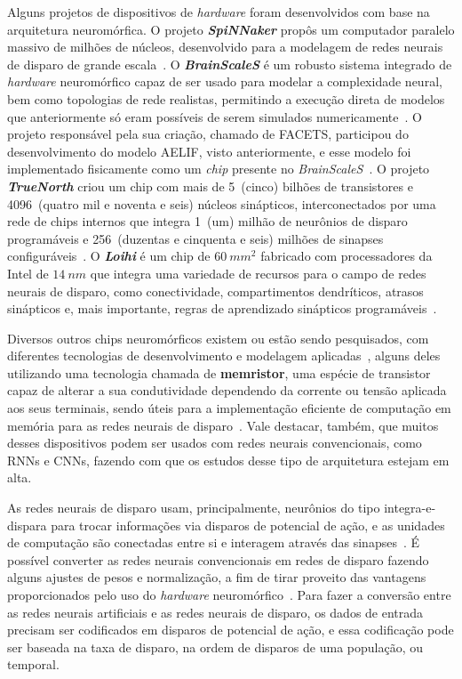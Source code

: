 Alguns projetos de dispositivos de \textit{hardware} foram desenvolvidos com base na arquitetura neuromórfica. O projeto \textbf{\textit{SpiNNaker}} propôs um computador paralelo massivo de milhões de núcleos, desenvolvido para a modelagem de redes neurais de disparo de grande escala~\cite{furber_spinnaker_2014}. O \textbf{\textit{BrainScaleS}} é um robusto sistema integrado de \textit{hardware} neuromórfico capaz de ser usado para modelar a complexidade neural, bem como topologias de rede realistas, permitindo a execução direta de modelos que anteriormente só eram possíveis de serem simulados numericamente~\cite{schemmel_wafer-scale_2010}. O projeto responsável pela sua criação, chamado de FACETS, participou do desenvolvimento do modelo AELIF, visto anteriormente, e esse modelo foi implementado fisicamente como um \textit{chip} presente no \textit{BrainScaleS}~\cite{aamir_lif_2017}. O projeto \textbf{\textit{TrueNorth}} criou um chip com mais de 5~(cinco) bilhões de transistores e 4096~(quatro mil e noventa e seis) núcleos sinápticos, interconectados por uma rede de chips internos que integra 1~(um) milhão de neurônios de disparo programáveis e 256~(duzentas e cinquenta e seis) milhões de sinapses configuráveis~\cite{merolla_million_2014}. O \textbf{\textit{Loihi}} é um chip de $60\ mm^2$ fabricado com processadores da Intel de $14\ nm$ que integra uma variedade de recursos para o campo de redes neurais de disparo, como conectividade, compartimentos dendríticos, atrasos sinápticos e, mais importante, regras de aprendizado sinápticos programáveis~\cite{davies_loihi_2018}.

Diversos outros chips neuromórficos existem ou estão sendo pesquisados, com diferentes tecnologias de desenvolvimento e modelagem aplicadas~\cite{mehonic_brain-inspired_2022}, 
alguns deles utilizando uma tecnologia chamada de \textbf{memristor}, uma espécie de transistor capaz de alterar a sua condutividade dependendo da corrente ou tensão aplicada aos seus terminais, sendo úteis para a implementação eficiente de computação em memória para as redes neurais de disparo~\cite{mehonic_memristorsmemory_2020}. Vale destacar, também, que muitos desses dispositivos podem ser usados com redes neurais convencionais, como RNNs e CNNs, fazendo com que os estudos desse tipo de arquitetura estejam em alta.

As redes neurais de disparo usam, principalmente, neurônios do tipo integra-e-dispara para trocar informações via disparos de potencial de ação, e as unidades de computação são conectadas entre si e interagem através das sinapses~\cite{roy_towards_2019}. É possível converter as redes neurais convencionais em redes de disparo fazendo alguns ajustes de pesos e normalização, a fim de tirar proveito das vantagens proporcionados pelo uso do \textit{hardware} neuromórfico~\cite{diehl_conversion_2016}. Para fazer a conversão entre as redes neurais artificiais e as redes neurais de disparo, os dados de entrada precisam ser codificados em disparos de potencial de ação, e essa codificação pode ser baseada na taxa de disparo, na ordem de disparos de uma população, ou temporal.

